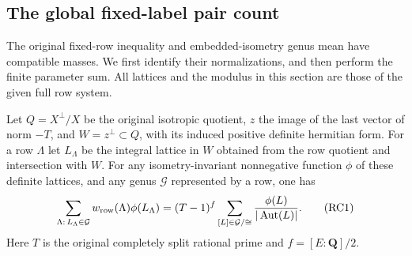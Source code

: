 \subsection{The global fixed-label pair count}
\label{sec:flag-global-pair-count}

The original fixed-row inequality and embedded-isometry
genus mean have compatible masses. We first identify their
normalizations, and then perform the finite parameter sum.
All lattices and the modulus in this section are those of
the given full row system.

\begin{lemma}
\label{lem:flag-row-genus-mass}
Let \(Q=X^\perp/X\) be the original isotropic quotient,
\(z\) the image of the last vector of norm \(-T\),
and \(W=z^\perp\subset Q\), with its induced positive
definite hermitian form. For a row \(\Lambda\) let
\(L_\Lambda\) be the integral lattice in \(W\) obtained
from the row quotient and intersection with \(W\).
For any isometry-invariant nonnegative function \(\phi\)
of these definite lattices, and any genus \(\mathcal G\)
represented by a row, one has
\[
 \sum_{\Lambda:\,L_\Lambda\in\mathcal G}
     w_{\rm row}(\Lambda)\phi(L_\Lambda)
  =(T-1)^f
    \sum_{[L]\in\mathcal G/\cong}
       \frac{\phi(L)}{|\operatorname{Aut}(L)|}.
 \tag{RC1}
\]
Here \(T\) is the original completely split rational
prime and \(f=[E:\mathbf Q]/2\).
\end{lemma}

